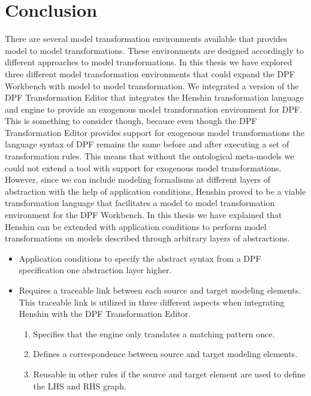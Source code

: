 
\chapter{Conclusion} %

\label{Chapter7} %


There are several model transformation environments available that provides
model to model transformations. These environments are designed accordingly
to different approaches to model transformations. In this thesis we have
explored three different model transformation environments that could expand the
DPF Workbench with model to model transformation. We integrated a version of the
DPF Transformation Editor that integrates the Henshin transformation language
and engine to provide an exogenous model transformation environment for DPF.
This is something to consider though, because even though the DPF Transformation
Editor provides support for exogenous model transformations the language syntax
of DPF remains the same before and after executing a set of transformation
rules. This means that without the ontological meta-models we could not extend
a tool with support for exogenous model transformations. However, since we can
include modeling formalisms at different layers of abstraction with the help of
application conditions, Henshin proved to be a viable transformation language
that facilitates a model to model transformation environment for the DPF
Workbench. In this thesis we have explained that Henshin can be extended with
application conditions to perform model transformations on models described
through arbitrary layers of abstractions.

\begin{itemize}
  \item Application conditions to specify the abstract syntax from a DPF
  specification one abstraction layer higher.
   \item Requires a traceable link between each source and target modeling
  elements. This traceable link is utilized in three different aspects when
  integrating Henshin with the DPF Transformation Editor. 
	\begin{enumerate} 
	  	\item Specifies that the engine only translates a matching pattern once.
        \item Defines a correspondence between source and target modeling
        elements. 
        \item Reusable in other rules if the source and target element are used
        to define the LHS and RHS graph.
     \end{enumerate}
     
\end{itemize}


